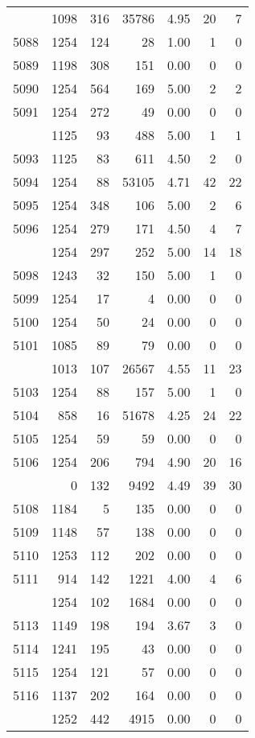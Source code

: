 \documentclass[
]{article}
\begin{document}
\begin{table}
\begin{tabular}[t]{lrrrrrr}
\addlinespace
5087 & 1098 & 316 & 35786 & 4.95 & 20 & 7\\
5088 & 1254 & 124 & 28 & 1.00 & 1 & 0\\
5089 & 1198 & 308 & 151 & 0.00 & 0 & 0\\
5090 & 1254 & 564 & 169 & 5.00 & 2 & 2\\
5091 & 1254 & 272 & 49 & 0.00 & 0 & 0\\
\addlinespace
5092 & 1125 & 93 & 488 & 5.00 & 1 & 1\\
5093 & 1125 & 83 & 611 & 4.50 & 2 & 0\\
5094 & 1254 & 88 & 53105 & 4.71 & 42 & 22\\
5095 & 1254 & 348 & 106 & 5.00 & 2 & 6\\
5096 & 1254 & 279 & 171 & 4.50 & 4 & 7\\
\addlinespace
5097 & 1254 & 297 & 252 & 5.00 & 14 & 18\\
5098 & 1243 & 32 & 150 & 5.00 & 1 & 0\\
5099 & 1254 & 17 & 4 & 0.00 & 0 & 0\\
5100 & 1254 & 50 & 24 & 0.00 & 0 & 0\\
5101 & 1085 & 89 & 79 & 0.00 & 0 & 0\\
\addlinespace
5102 & 1013 & 107 & 26567 & 4.55 & 11 & 23\\
5103 & 1254 & 88 & 157 & 5.00 & 1 & 0\\
5104 & 858 & 16 & 51678 & 4.25 & 24 & 22\\
5105 & 1254 & 59 & 59 & 0.00 & 0 & 0\\
5106 & 1254 & 206 & 794 & 4.90 & 20 & 16\\
\addlinespace
5107 & 0 & 132 & 9492 & 4.49 & 39 & 30\\
5108 & 1184 & 5 & 135 & 0.00 & 0 & 0\\
5109 & 1148 & 57 & 138 & 0.00 & 0 & 0\\
5110 & 1253 & 112 & 202 & 0.00 & 0 & 0\\
5111 & 914 & 142 & 1221 & 4.00 & 4 & 6\\
\addlinespace
5112 & 1254 & 102 & 1684 & 0.00 & 0 & 0\\
5113 & 1149 & 198 & 194 & 3.67 & 3 & 0\\
5114 & 1241 & 195 & 43 & 0.00 & 0 & 0\\
5115 & 1254 & 121 & 57 & 0.00 & 0 & 0\\
5116 & 1137 & 202 & 164 & 0.00 & 0 & 0\\
\addlinespace
5117 & 1252 & 442 & 4915 & 0.00 & 0 & 0\\

\end{tabular}
\end{table}
\end{document}
